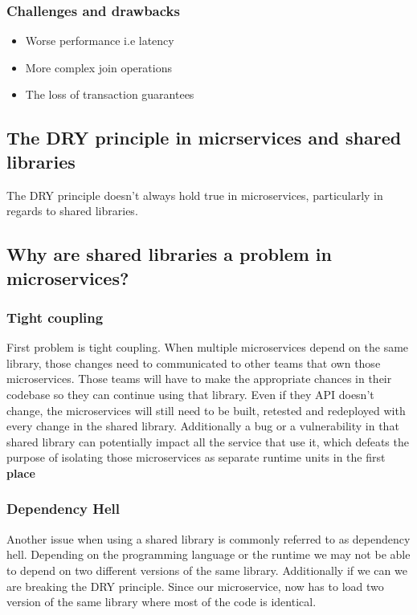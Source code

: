 \documentclass[a4paper, 11pt]{book}
\begin{document}
    \subsubsection{Challenges and drawbacks}
    \begin{itemize}
        \item Worse performance i.e latency
        \item More complex join operations
        \item The loss of transaction guarantees
    \end{itemize}

    \subsection{The DRY principle in micrservices and shared libraries}
    The DRY principle doesn't always hold true in microservices, particularly in regards to shared libraries.

    \subsection{Why are shared libraries a problem in microservices?}

    \subsubsection{Tight coupling}
    First problem is tight coupling.
    When multiple microservices depend on the same library, those changes need to communicated to other teams that own those microservices.
    Those teams will have to make the appropriate chances in their codebase so they can continue using that library.
    Even if they API doesn't change, the microservices will still need to be built, retested and redeployed with every change in the shared library.
    Additionally a bug or a vulnerability in that shared library can potentially impact all the service that use it, which defeats the purpose of isolating those microservices as separate runtime units in the first \textbf{place}

    \subsubsection{Dependency Hell}
    Another issue when using a shared library is commonly referred to as dependency hell.
    Depending on the programming language or the runtime we may not be able to depend on two different versions of the same library.
    Additionally if we can we are breaking the DRY principle.
    Since our microservice, now has to load two version of the same library where most of the code is identical.
\end{document}

